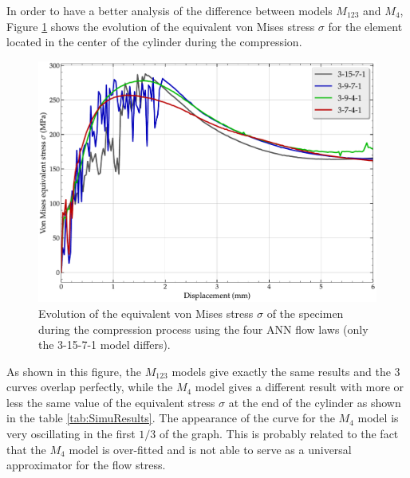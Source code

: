 \documentclass[algorithms,article,submit,pdftex,moreauthors]{Definitions/mdpi}
\begin{document}
In order to have a better analysis of the difference between models $M_{123}$ and $M_4$, Figure \ref{fig:misesCurve} shows the evolution of the equivalent von Mises stress $\sigma$ for the element located in the center of the cylinder during the compression.
\begin{figure}[!ht]
\centering
\includegraphics[width=0.75\columnwidth]{Figures/vonMisesCurve}
\caption{Evolution of the equivalent von Mises stress $\sigma$ of the specimen during the compression process using the four ANN flow laws (only the 3-15-7-1 model differs).}
\label{fig:misesCurve}
\end{figure}
As shown in this figure, the $M_{123}$ models give exactly the same results and the $3$ curves overlap perfectly, while the $M_4$ model gives a different result with more or less the same value of the equivalent stress $\sigma$ at the end of the cylinder as shown in the table \ref{tab:SimuResults}.
The appearance of the curve for the $M_4$ model is very oscillating in the first $1/3$ of the graph.
This is probably related to the fact that the $M_4$ model is over-fitted and is not able to serve as a universal approximator for the flow stress.
\end{document}
